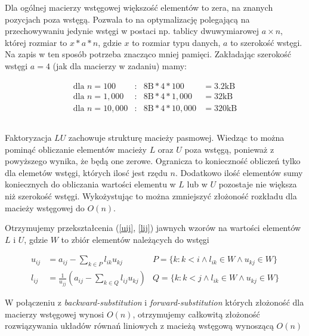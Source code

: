 \documentclass[11pt]{extarticle}
\begin{document}
	Dla ogólnej macierzy wstęgowej większość elementów to zera, na znanych pozycjach poza wstęgą.
	Pozwala to na optymalizację polegającą na przechowywaniu jedynie wstęgi w postaci np. tablicy dwuwymiarowej \(a\times n\),
	której rozmiar to \(x*a*n\), gdzie \(x\) to rozmiar typu danych, \(a\) to szerokość wstęgi.
	Na zapis w ten sposób potrzeba znacząco mniej pamięci. Zakładając szerokość wstęgi \(a=4\) (jak dla macierzy w zadaniu) mamy:

	\begin{align}
		\text{dla } n=100 &:& 8\text{B}*4*100 &= 3.2\text{kB} \\
		\text{dla } n=1,000 &:& 8\text{B}*4*1,000 &= 32\text{kB} \\
		\text{dla } n=10,000 &:& 8\text{B}*4*10,000 &= 320\text{kB}
	\end{align}

	\subsection{}

	Faktoryzacja \(LU\) zachowuje strukturę macieży pasmowej.
	Wiedząc to można pominąć obliczanie elementów macieży \(L\) oraz \(U\) poza wstęgą, ponieważ z powyższego wynika, że będą one zerowe.
	Ogranicza to konieczność obliczeń tylko dla elemetów wstęgi, których ilosć jest rzędu \(n\).	
	Dodatkowo ilość elementów sumy koniecznych do obliczania wartości elementu w \(L\) lub w \(U\) pozostaje nie większa niż szerokość wstęgi.
	Wykożystując to można zmniejszyć złożoność rozkładu dla macieży wstęgowej do \(O(n)\).
	
	Otrzymujemy przekształcenia (\ref{uij}, \ref{lij}) jawnych wzorów na wartości elementów \(L\) i \(U\),
	gdzie \(W\) to zbiór elementów należących do wstęgi

	\begin{align}
		\label{uij}
		u_{ij} &= a_{ij} - \sum_{k \in P} l_{ik}u_{kj}									&P = \{ k:  k<i \land l_{ik} \in W \land u_{kj} \in W \} \\
		\label{lij}
		l_{ij} &= \frac{1}{u_{jj}} \left( a_{ij} - \sum_{k \in Q} l_{ij}u_{kj} \right)  &Q = \{ k: k<j \land l_{ik} \in W \land u_{kj} \in W \} 
	\end{align}

	W połączeniu z \emph{backward-substitution} i \emph{forward-substitution} których złożoność dla macierzy wstęgowej wynosi \(O(n)\),
	otrzymujemy całkowitą złożoność rozwiązywania układów równań liniowych z macieżą wstęgową wynoszącą \(O(n)\)
\end{document}
